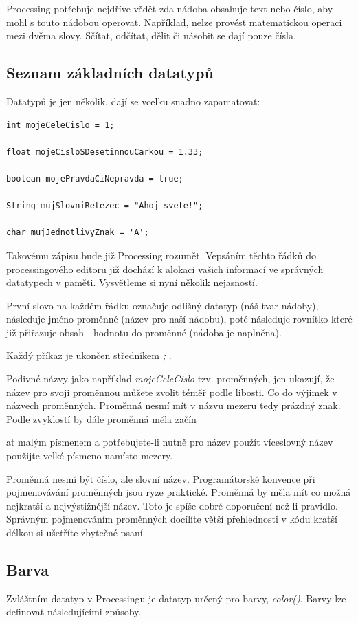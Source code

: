 \documentclass[10pt]{book}
\newcommand{\pododdil}[1]{\subsection{#1}\index{#1}\label{#1}}
\newcommand{\vyraz}[1]{\textit{\gls{#1}}\index{#1}\label{#1}}
\begin{document}
Processing potřebuje nejdříve vědět zda nádoba obsahuje text nebo číslo, aby mohl s touto nádobou operovat. Například, nelze provést matematickou operaci mezi dvěma slovy. Sčítat, odčítat, dělit či násobit se dají pouze čísla.


\pododdil{Seznam základních datatypů}
Datatypů je jen několik, dají se vcelku snadno zapamatovat:

\begin{lstlisting}
int mojeCeleCislo = 1;

float mojeCisloSDesetinnouCarkou = 1.33;

boolean mojePravdaCiNepravda = true;

String mujSlovniRetezec = "Ahoj svete!";

char mujJednotlivyZnak = 'A';

\end{lstlisting}

Takovému zápisu bude již Processing rozumět. Vepsáním těchto řádků do processingového editoru již dochází k alokaci vašich informací ve správných datatypech v paměti. Vysvětleme si nyní několik nejasností.

První slovo na každém řádku označuje odlišný datatyp (náš tvar nádoby), následuje jméno proměnné (název pro naší nádobu), poté následuje rovnítko které již přiřazuje obsah - hodnotu do proměnné (nádoba je naplněna).

Každý příkaz je ukončen středníkem {\em ;} .

Podivné názvy jako například {\em mojeCeleCislo} tzv. proměnných, jen ukazují, že název pro svoji proměnnou můžete zvolit téměř podle libosti. Co do výjimek v názvech proměnných. Proměnná nesmí mít v názvu mezeru tedy prázdný znak. Podle zvyklostí by dále proměnná měla začín

at malým písmenem a potřebujete-li nutně pro název použít víceslovný název použijte velké písmeno namísto mezery.

Proměnná nesmí být číslo, ale slovní název. Programátorské konvence při pojmenovávání proměnných jsou ryze praktické. Proměnná by měla mít co možná nejkratší a nejvýstižnější název.  Toto je spíše dobré doporučení než-li pravidlo. Správným pojmenováním proměnných docílíte větší přehlednosti v kódu kratší délkou si ušetříte zbytečné psaní.


\pododdil{Barva}

Zvláštním datatyp v Processingu je datatyp určený pro barvy, \vyraz{color()}. Barvy lze definovat následujícími způsoby. 
\end{document}
